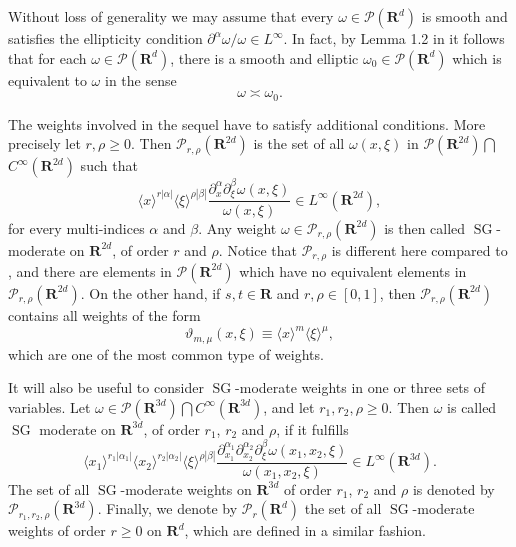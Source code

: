 \documentclass[12pt,a4paper,reqno]{amsart}
\numberwithin{equation}{section}
\numberwithin{thm}{section}
\theoremstyle{definition}
\theoremstyle{remark}
\begin{document}
\par

Without loss of generality we may assume that every $\omega \in
\mathscr P({\mathbf R^{d}})$ is smooth and satisfies the ellipticity condition
$\partial ^\alpha \omega / \omega \in L^\infty$. In fact,
by Lemma 1.2 in \cite {To8} it follows
that for each $\omega \in \mathscr P({\mathbf R^{d}})$, there is a smooth and
elliptic $\omega _0\in \mathscr P({\mathbf R^{d}})$ which is equivalent to
$\omega$ in the sense
\begin{equation}\label{onestar}
\omega \asymp \omega _0.
\end{equation}

\par

The weights involved in the sequel have to satisfy additional conditions.
More precisely let $r,\rho \ge0$. Then $\mathscr P_{r,\rho}({\mathbf R^{{2d}}})$ is
the set of all $\omega (x,\xi )$ in $\mathscr P({\mathbf R^{{2d}}})\bigcap$ $C^\infty ({\mathbf R^{{2d}}})$ such that
\begin{equation}\label{SGCondWeight}
{\langle x\rangle}^{r|\alpha |}{\langle \xi\rangle} ^{\rho |\beta |}\frac {\partial ^\alpha
_x\partial ^\beta _\xi \omega (x,\xi )}{\omega (x,\xi )}\in L^\infty
({\mathbf R^{{2d}}}),
\end{equation}
for every multi-indices $\alpha$ and $\beta$. Any weight
$\omega\in{\mathscr P}_{r,\rho}({\mathbf R^{{2d}}})$ is then called ${\operatorname{SG}}$-moderate on
${\mathbf R^{{2d}}}$, of order $r$ and $\rho$. Notice that $\mathscr P_{r,\rho}$
is different here compared to \cite{CJT1}, and
there are elements in $ \mathscr P({\mathbf R^{{2d}}})$ which have
no equivalent elements in $\mathscr P_{r,\rho}({\mathbf R^{{2d}}})$.
On the other hand, if $s, t\in
\mathbf R$ and $r, \rho \in [0,1]$, then $\mathscr P_{r,\rho} ({\mathbf R^{{2d}}})$
contains all weights of the form
\begin{equation}\label{varthetaWeights}
\vartheta _{m,\mu} (x,\xi )\equiv {\langle x\rangle} ^m{\langle \xi\rangle} ^\mu ,
\end{equation}
which are one of the most common type of weights.

\par

It will also be useful to consider ${\operatorname{SG}}$-moderate weights in one or three
sets of variables. Let $\omega \in \mathscr P({\mathbf R^{{3d}}})\bigcap C^\infty ({\mathbf R^{{3d}}})$,
and let $r_1,r_2,\rho \ge 0$. Then $\omega$ is called ${\operatorname{SG}}$ moderate on ${\mathbf R^{{3d}}}$,
of order $r_1$, $r_2$ and $\rho$, if  it fulfills
$$
{\langle {x_1}\rangle}^{r_1|\alpha _1|} {\langle {x_2}\rangle}^{r_2|\alpha _2|} {\langle \xi\rangle} ^{\rho |\beta |}
\frac{\partial _{x_1}^{\alpha _1} \partial _{x_2}^{\alpha _2} \partial _\xi ^\beta \omega (x_1,x_2,\xi )}
       {\omega (x_1,x_2,\xi )}
\in L^\infty({\mathbf R^{{3d}}}).
$$
The set of all ${\operatorname{SG}}$-moderate weights on ${\mathbf R^{{3d}}}$ of order $r_1$, $r_2$ and $\rho$
is denoted by ${\mathscr P} _{r_1,r_2,\rho}({\mathbf R^{{3d}}})$. Finally, we denote by ${\mathscr P}_{r}({\mathbf R^{{d}}})$ the
set of all ${\operatorname{SG}}$-moderate weights of order $r\ge0$ on ${\mathbf R^{d}}$, which are defined in a
similar fashion.
\end{document}
